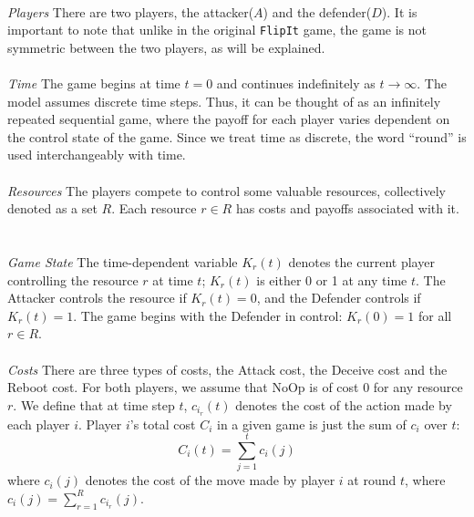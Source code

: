\documentclass[11pt]{article}
\theoremstyle{plain}
\begin{document}
    ~\\
    \textit{Players} \hspace*{0.1cm}
    There are two players, the attacker($A$) and the defender($D$). 
    It is important to note that unlike in the original \texttt{FlipIt} game, the game is not symmetric between the two players, as will be explained.
    ~\\\\
    \textit{Time} \hspace*{0.1cm}
    The game begins at time $t = 0$ and continues indefinitely as $t \rightarrow \infty$. The model assumes discrete time steps. Thus, it can be thought of as an infinitely repeated sequential game, where the payoff for each player varies dependent on the control state of the game. Since we treat time as discrete, the word ``round'' is used interchangeably with time.
    ~\\\\
    \textit{Resources} \hspace*{0.1cm}
    The players compete to control some valuable resources, collectively denoted as a set $R$. Each resource $r \in R$ has costs and payoffs associated with it.
    ~\\\\
    \textit{Game State} \hspace*{0.1cm}
    The time-dependent variable $K_r(t)$ denotes the current player controlling the resource $r$ at time $t$; $K_r(t)$ is either 0 or 1 at any time $t$. The Attacker controls the resource if $K_r(t) = 0$, and the Defender controls if $K_r(t)=1$.
    The game begins with the Defender in control: $K_r(0) = 1$ for all $r \in R$.
    ~\\\\
    \textit{Costs} \hspace*{0.1cm}
    There are three types of costs, the Attack cost, the Deceive cost and the Reboot cost. 
    For both players, we assume that NoOp is of cost 0 for any resource $r$.
    We define that at time step $t$, $c_{i_r}(t)$ denotes the cost of the action made by each player $i$. 
    Player $i$’s total cost $C_i$ in a given game is just the sum of $c_i$  over $t$:
    $$C_i(t) = \sum_{j=1}^{t} c_i(j) $$
    where $c_i(j)$ denotes the cost of the move made by  player $i$ at round $t$, 
    where $c_i(j) = \sum_{r=1}^{R} c_{i_r}(j)$.
    ~\\\\
\end{document}

